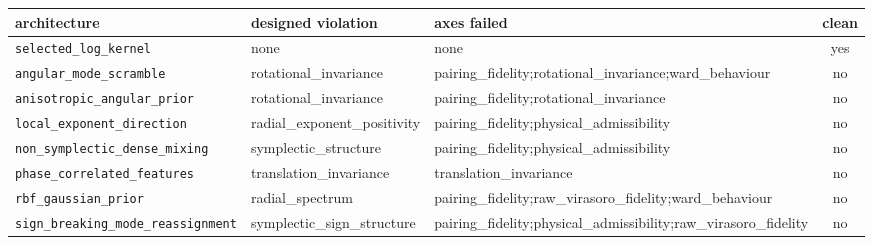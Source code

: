 \begin{tabular}{lllc}
\hline
architecture & designed violation & axes failed & clean \\
\hline
\texttt{selected\_log\_kernel} & none & none & yes \\
\texttt{angular\_mode\_scramble} & rotational\_invariance & pairing\_fidelity;rotational\_invariance;ward\_behaviour & no \\
\texttt{anisotropic\_angular\_prior} & rotational\_invariance & pairing\_fidelity;rotational\_invariance & no \\
\texttt{local\_exponent\_direction} & radial\_exponent\_positivity & pairing\_fidelity;physical\_admissibility & no \\
\texttt{non\_symplectic\_dense\_mixing} & symplectic\_structure & pairing\_fidelity;physical\_admissibility & no \\
\texttt{phase\_correlated\_features} & translation\_invariance & translation\_invariance & no \\
\texttt{rbf\_gaussian\_prior} & radial\_spectrum & pairing\_fidelity;raw\_virasoro\_fidelity;ward\_behaviour & no \\
\texttt{sign\_breaking\_mode\_reassignment} & symplectic\_sign\_structure & pairing\_fidelity;physical\_admissibility;raw\_virasoro\_fidelity & no \\
\hline
\end{tabular}
